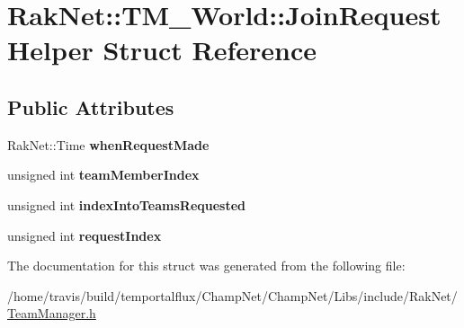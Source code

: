 \hypertarget{struct_rak_net_1_1_t_m___world_1_1_join_request_helper}{\section{Rak\-Net\-:\-:T\-M\-\_\-\-World\-:\-:Join\-Request\-Helper Struct Reference}
\label{struct_rak_net_1_1_t_m___world_1_1_join_request_helper}
}
\subsection*{Public Attributes}
\begin{DoxyCompactItemize}
\item 
\hypertarget{struct_rak_net_1_1_t_m___world_1_1_join_request_helper_a0ed9c55201ba75bb8892b3305648f1c5}{Rak\-Net\-::\-Time {\bfseries when\-Request\-Made}}\label{struct_rak_net_1_1_t_m___world_1_1_join_request_helper_a0ed9c55201ba75bb8892b3305648f1c5}

\item 
\hypertarget{struct_rak_net_1_1_t_m___world_1_1_join_request_helper_a2a7a94584b62592698b370d2424c0446}{unsigned int {\bfseries team\-Member\-Index}}\label{struct_rak_net_1_1_t_m___world_1_1_join_request_helper_a2a7a94584b62592698b370d2424c0446}

\item 
\hypertarget{struct_rak_net_1_1_t_m___world_1_1_join_request_helper_a2bcc304961da912e59193e95b61e5b10}{unsigned int {\bfseries index\-Into\-Teams\-Requested}}\label{struct_rak_net_1_1_t_m___world_1_1_join_request_helper_a2bcc304961da912e59193e95b61e5b10}

\item 
\hypertarget{struct_rak_net_1_1_t_m___world_1_1_join_request_helper_aa1094aebc92fc7408707dd28ca75b860}{unsigned int {\bfseries request\-Index}}\label{struct_rak_net_1_1_t_m___world_1_1_join_request_helper_aa1094aebc92fc7408707dd28ca75b860}

\end{DoxyCompactItemize}


The documentation for this struct was generated from the following file\-:\begin{DoxyCompactItemize}
\item 
/home/travis/build/temportalflux/\-Champ\-Net/\-Champ\-Net/\-Libs/include/\-Rak\-Net/\hyperlink{_team_manager_8h}{Team\-Manager.\-h}\end{DoxyCompactItemize}
